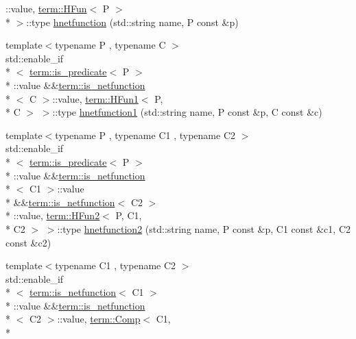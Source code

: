 \begin{DoxyCompactItemize}
\+::value, \hyperlink{structpfq__lang_1_1term_1_1HFun}{term\+::\+H\+Fun}$<$ P $>$\\*
 $>$\+::type \hyperlink{namespacepfq__lang_a78972807ac46884d5cd0719795946936}{hnetfunction} (std\+::string name, P const \&p)
\item 
{\footnotesize template$<$typename P , typename C $>$ }\\std\+::enable\+\_\+if\\*
$<$ \hyperlink{structpfq__lang_1_1term_1_1is__predicate}{term\+::is\+\_\+predicate}$<$ P $>$\\*
\+::value \&\&\hyperlink{structpfq__lang_1_1term_1_1is__netfunction}{term\+::is\+\_\+netfunction}\\*
$<$ C $>$\+::value, \hyperlink{structpfq__lang_1_1term_1_1HFun1}{term\+::\+H\+Fun1}$<$ P, \\*
C $>$ $>$\+::type \hyperlink{namespacepfq__lang_a71df0d0d66c45c40ad348a35a1781c71}{hnetfunction1} (std\+::string name, P const \&p, C const \&c)
\item 
{\footnotesize template$<$typename P , typename C1 , typename C2 $>$ }\\std\+::enable\+\_\+if\\*
$<$ \hyperlink{structpfq__lang_1_1term_1_1is__predicate}{term\+::is\+\_\+predicate}$<$ P $>$\\*
\+::value \&\&\hyperlink{structpfq__lang_1_1term_1_1is__netfunction}{term\+::is\+\_\+netfunction}\\*
$<$ C1 $>$\+::value \\*
\&\&\hyperlink{structpfq__lang_1_1term_1_1is__netfunction}{term\+::is\+\_\+netfunction}$<$ C2 $>$\\*
\+::value, \hyperlink{structpfq__lang_1_1term_1_1HFun2}{term\+::\+H\+Fun2}$<$ P, C1, \\*
C2 $>$ $>$\+::type \hyperlink{namespacepfq__lang_a0899ef1c7c1872d3d2da51cf5704ab84}{hnetfunction2} (std\+::string name, P const \&p, C1 const \&c1, C2 const \&c2)
\item 
{\footnotesize template$<$typename C1 , typename C2 $>$ }\\std\+::enable\+\_\+if\\*
$<$ \hyperlink{structpfq__lang_1_1term_1_1is__netfunction}{term\+::is\+\_\+netfunction}$<$ C1 $>$\\*
\+::value \&\&\hyperlink{structpfq__lang_1_1term_1_1is__netfunction}{term\+::is\+\_\+netfunction}\\*
$<$ C2 $>$\+::value, \hyperlink{structpfq__lang_1_1term_1_1Comp}{term\+::\+Comp}$<$ C1, \\*

\end{DoxyCompactItemize}
